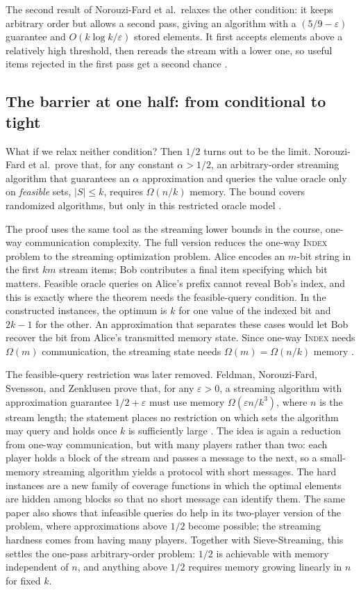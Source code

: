 \documentclass[10pt]{article}
\begin{document}
The second result of Norouzi-Fard et al.\ relaxes the other condition: it keeps arbitrary order but allows a second pass, giving an algorithm with a $(5/9-\varepsilon)$ guarantee and $O(k\log k/\varepsilon)$ stored elements. It first accepts elements above a relatively high threshold, then rereads the stream with a lower one, so useful items rejected in the first pass get a second chance \cite{norouzifard2018beyond}.

\subsection{The barrier at one half: from conditional to tight}
\label{sec:barrier}
What if we relax neither condition? Then $1/2$ turns out to be the limit. Norouzi-Fard et al.\ prove that, for any constant $\alpha>1/2$, an arbitrary-order streaming algorithm that guarantees an $\alpha$ approximation and queries the value oracle only on \emph{feasible} sets, $|S|\leq k$, requires $\Omega(n/k)$ memory. The bound covers randomized algorithms, but only in this restricted oracle model \cite{norouzifard2018beyond}.

The proof uses the same tool as the streaming lower bounds in the course, one-way communication complexity. The full version reduces the one-way \textsc{Index} problem to the streaming optimization problem. Alice encodes an $m$-bit string in the first $km$ stream items; Bob contributes a final item specifying which bit matters. Feasible oracle queries on Alice's prefix cannot reveal Bob's index, and this is exactly where the theorem needs the feasible-query condition. In the constructed instances, the optimum is $k$ for one value of the indexed bit and $2k-1$ for the other. An approximation that separates these cases would let Bob recover the bit from Alice's transmitted memory state. Since one-way \textsc{Index} needs $\Omega(m)$ communication, the streaming state needs $\Omega(m)=\Omega(n/k)$ memory \cite{norouzifard2018beyond}.

The feasible-query restriction was later removed. Feldman, Norouzi-Fard, Svensson, and Zenklusen prove that, for any $\varepsilon>0$, a streaming algorithm with approximation guarantee $1/2+\varepsilon$ must use memory $\Omega(\varepsilon n/k^3)$, where $n$ is the stream length; the statement places no restriction on which sets the algorithm may query and holds once $k$ is sufficiently large \cite{feldman2020oneway}. The idea is again a reduction from one-way communication, but with many players rather than two: each player holds a block of the stream and passes a message to the next, so a small-memory streaming algorithm yields a protocol with short messages. The hard instances are a new family of coverage functions in which the optimal elements are hidden among blocks so that no short message can identify them. The same paper also shows that infeasible queries do help in its two-player version of the problem, where approximations above $1/2$ become possible; the streaming hardness comes from having many players. Together with Sieve-Streaming, this settles the one-pass arbitrary-order problem: $1/2$ is achievable with memory independent of $n$, and anything above $1/2$ requires memory growing linearly in $n$ for fixed $k$.
\end{document}
